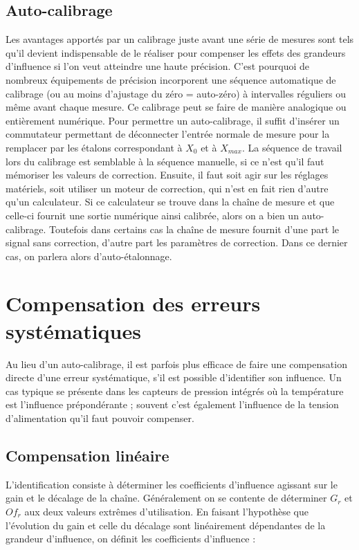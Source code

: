 \subsection{Auto-calibrage }
Les avantages apportés par un calibrage juste avant une série de mesures sont tels qu'il devient indispensable de le réaliser pour compenser les effets des grandeurs d'influence si l'on veut atteindre une haute précision. C'est pourquoi de nombreux équipements de précision incorporent une séquence automatique de calibrage (ou au moins d'ajustage du zéro = auto-zéro) à intervalles réguliers ou même avant chaque mesure. Ce calibrage peut se faire de manière analogique ou entièrement numérique.
Pour permettre un auto-calibrage, il suffit d'insérer un commutateur permettant de déconnecter l'entrée normale de mesure pour la remplacer par les étalons correspondant à $X_0$ et à $X_{max}$. La séquence de travail lors du calibrage est semblable à la séquence manuelle, si ce n'est qu'il faut mémoriser les valeurs de correction. Ensuite, il faut soit agir sur les réglages matériels, soit utiliser un moteur de correction, qui n'est en fait rien d'autre qu'un calculateur. Si ce calculateur se trouve dans la chaîne de mesure et que celle-ci fournit une sortie numérique ainsi calibrée, alors on a bien un auto-calibrage. Toutefois dans certains cas la chaîne de mesure fournit d'une part le signal sans correction, d'autre part les paramètres de correction. Dans ce dernier cas, on parlera alors d'auto-étalonnage.

\section{Compensation des erreurs systématiques}

Au lieu d'un auto-calibrage, il est parfois plus efficace de faire une compensation directe d'une erreur systématique, s'il est possible d'identifier son influence. Un cas typique se présente dans les capteurs de pression intégrés où la température est l'influence prépondérante ; souvent c'est également l'influence de la tension d'alimentation qu'il faut pouvoir compenser.

\subsection{Compensation linéaire }
L'identification consiste à déterminer les coefficients d'influence agissant sur le gain et le décalage de la chaîne. Généralement on se contente de déterminer $G_r$ et $Of_r$ aux deux valeurs extrêmes d'utilisation. En faisant l'hypothèse que l'évolution du gain et celle du décalage sont linéairement dépendantes de la grandeur d'influence, on définit les coefficients d'influence :

